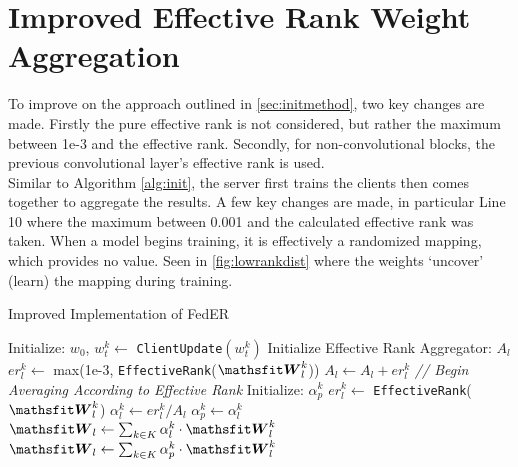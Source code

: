 \section{Improved Effective Rank Weight Aggregation}
To improve on the approach outlined in \autoref{sec:initmethod}, two key changes are made. Firstly the pure effective rank is not considered, but rather the maximum between 1e-3 and the effective rank. Secondly, for non-convolutional blocks, the previous convolutional layer's effective rank is used.\\

Similar to Algorithm \autoref{alg:init}, the server first trains the clients then comes together to aggregate the results. A few key changes are made, in particular Line 10 where the maximum between 0.001 and the calculated effective rank was taken. When a model begins training, it is effectively a randomized mapping, which provides no value. Seen in \autoref{fig:lowrankdist} where the weights `uncover' (learn) the mapping during training. \\

\begin{algorithm}[H]
\caption{Improved Implementation of FedER}
\begin{algorithmic}[1]
\State Initialize: $w_0$, 
        \State $w_{t}^{k} \leftarrow$ \texttt{ClientUpdate}$(w_{t}^{k})$ 
    \EndFor
    \State Initialize Effective Rank Aggregator: $A_l$
         
            \State $er_{l}^{k} \leftarrow $ max(1e-3, \texttt{EffectiveRank}($\tW_l^{k}$)) 
            \State $A_l \leftarrow A_l + er_{l}^{k}$
        \EndIf
    \EndFor
    \State \textit{// Begin Averaging According to Effective Rank}
        \State Initialize: $\alpha_p^k$ 
         
            \State $er_{l}^{k} \leftarrow $ \texttt{EffectiveRank}($\tW_l^{k}$) 
            \State $\alpha_l^k \leftarrow er_{l}^{k}/A_l$
            \State $\alpha_p^k \leftarrow \alpha_l^k$ 
            \State $\tW_l \leftarrow \sum_{k \in K} \alpha_l^k \cdot \tW_l^{k}$
        \EndIf
           \State $\tW_l \leftarrow \sum_{k \in K} \alpha_p^k \cdot \tW_l^{k}$ 
        \EndIf
    \EndFor
\EndFor
\EndProcedure
\end{algorithmic}
\end{algorithm}

